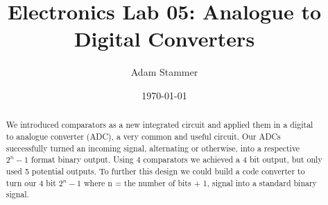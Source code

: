 \documentclass[prb,preprint]{revtex4-1}
\begin{document}
\title{Electronics Lab 05: Analogue to Digital Converters}
\author{Adam Stammer}

\date{\today}

\begin{abstract}
We introduced comparators as a new integrated circuit and applied them in a digital to analogue converter (ADC), a very common and useful circuit. Our ADCs successfully turned an incoming signal, alternating or otherwise, into a respective $2^{n}-1$ format binary output. Using 4 comparators we achieved a 4 bit output, but only used 5 potential outputs. To further this design we could build a code converter to turn our 4 bit $2^{n}-1$ where n = the number of bits + 1, signal into a standard binary signal.
\end{abstract}

\maketitle


%
%
%
%
%
%
%
%
\end{document}
